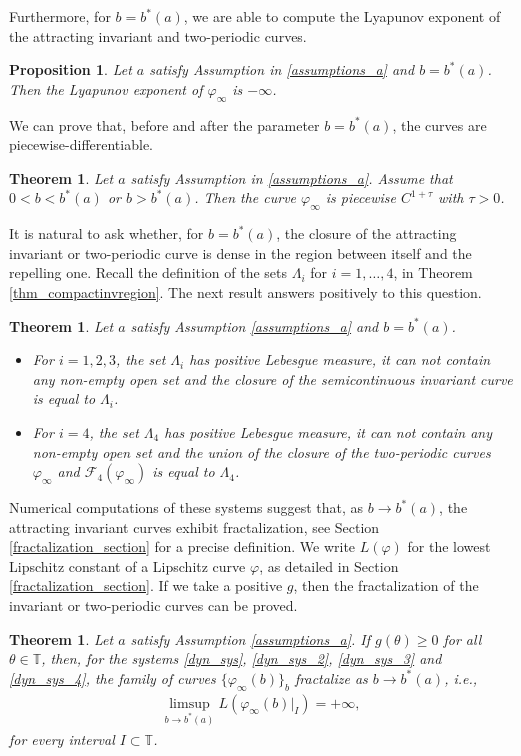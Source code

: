 \documentclass[12pt]{article}
\newcommand{\T}{\mathbb{T}}
\theoremstyle{plain}
\newtheorem{prop}[defn]{Proposition}
\newtheorem{thm}[defn]{Theorem}
\theoremstyle{remark}
\theoremstyle{definition}
\begin{document}
Furthermore, for $b=b^*(a)$, we are able to compute the Lyapunov exponent of the attracting invariant and two-periodic curves.
\begin{prop}\label{lyap_exp}
    Let $a$ satisfy Assumption in \eqref{assumptions_a} and $b=b^*(a)$. Then the Lyapunov exponent of $\varphi_\infty$ is $-\infty$.
\end{prop}

We can prove that, before and after the parameter $b=b^*(a)$, the curves are piecewise-differentiable.
\begin{thm}\label{regularity_thm}
    Let $a$ satisfy Assumption in \eqref{assumptions_a}. Assume that $0<b<b^*(a)$ or $b>b^*(a)$. Then the curve $\varphi_\infty$ is piecewise $C^{1+\tau}$ with $\tau>0$.
\end{thm}

It is natural to ask whether, for $b=b^*(a)$, the closure of the attracting invariant or two-periodic curve is dense in the region between itself and the repelling one. Recall the definition of the sets $\Lambda_i$ for $i=1,\dots,4$, in Theorem \ref{thm_compactinvregion}.
The next result answers positively to this question.
\begin{thm}\label{densegraph}
    Let $a$ satisfy Assumption  \eqref{assumptions_a} and $b=b^*(a)$.
    \begin{itemize}
        \item For $i=1,2,3$, the set $\Lambda_i$ has positive Lebesgue measure, it can not contain any non-empty open set and the closure of the semicontinuous invariant curve is equal to $\Lambda_i$.
        \item For $i=4$, the set $\Lambda_4$ has positive Lebesgue measure, it can not contain any non-empty open set and the union of the closure of  the two-periodic curves $\varphi_\infty$ and $\mathcal{F}_4(\varphi_\infty)$ is equal to $\Lambda_4$.
    \end{itemize}
\end{thm}

Numerical computations of these systems suggest that, as $b\to b^*(a)$, the attracting invariant curves exhibit fractalization, see Section \ref{fractalization_section} for a precise definition. We write $L(\varphi)$ for the lowest Lipschitz constant of a Lipschitz curve $\varphi$, as detailed in Section \ref{fractalization_section}. If we take a positive $g$, then the fractalization of the invariant or two-periodic curves can be proved.
\begin{thm}\label{weak_frac_thm}
    Let $a$ satisfy Assumption \eqref{assumptions_a}. If $g(\theta)\geq0$ for all $\theta\in\T$, then, for the systems \eqref{dyn_sys}, \eqref{dyn_sys_2}, \eqref{dyn_sys_3} and \eqref{dyn_sys_4}, the family of curves $\{\varphi_\infty(b)\}_b$ fractalize as $b\to b^*(a)$, i.e.,
        \begin{align*}
            \limsup_{b\to b^*(a)} L(\varphi_\infty(b)|_I) = +\infty,
        \end{align*}
        for every interval $I\subset\T$.
\end{thm}
\end{document}
